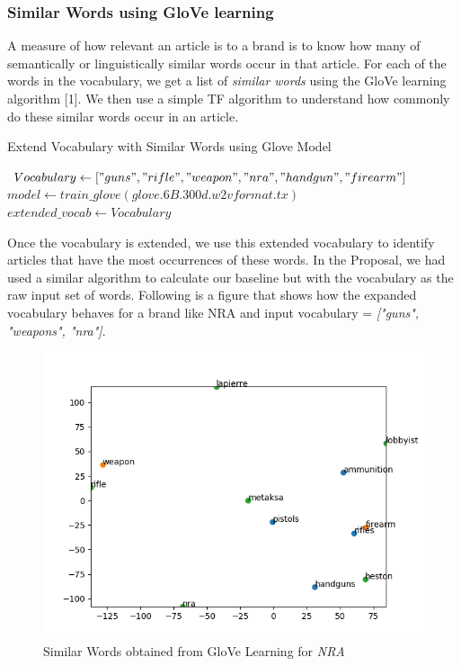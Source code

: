 \documentclass{article}
\begin{document}
\subsubsection {Similar Words using GloVe learning}
A measure of how relevant an article is to a brand is to know how many of semantically or linguistically similar words occur in that article. For each of the words in the vocabulary, we get a list of \textit{similar words} using the GloVe learning algorithm [1]. We then use a simple TF algorithm to understand how commonly do these similar words occur in an article. 

\begin{center}
\begin{algorithm}
  \caption{Extend Vocabulary with Similar Words using Glove Model}
  
 $Vocabulary \gets ["guns", "rifle", "weapon", "nra", "handgun", "firearm"] $\;
 $model \gets train\_glove(\textit{glove.6B.300d.w2vformat.tx}) $\;
  {
      $extended\_vocab \gets Vocabulary $\;
    \;
  }
\end{algorithm}
\end{center}

Once the vocabulary is extended, we use this extended vocabulary to identify articles that have the most occurrences of these words. In the Proposal, we had used a similar algorithm to calculate our baseline but with the vocabulary as the raw input set of words. Following is a figure that shows how the expanded vocabulary behaves for a brand like NRA and input vocabulary = \textit {["guns", "weapons", "nra"]}. 

\begin{figure}[ht]
	\centering
 	 \includegraphics[width=0.5\linewidth]{similar_words_nra.png}
	  \caption{Similar Words obtained from GloVe Learning for \textit{NRA}}
 	 \label{fig:Similar Words for NRA}
\end{figure}
\end{document}

